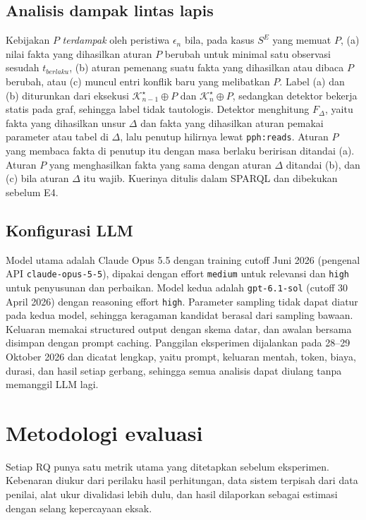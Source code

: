 \documentclass[journal,a4paper]{IEEEtran}
\makeatletter
\DeclareRobustCommand{\en}[1]{{\usefont{\f@encoding}{\f@family}{\f@series}{it}#1\/}}
\newcommand{\K}{\mathcal{K}}
\newcommand{\emas}{\star}
\newcommand{\SE}{S^{E}}
\makeatother
\begin{document}
\subsection{Analisis dampak lintas lapis}
Kebijakan $P$ \emph{terdampak} oleh peristiwa $\epsilon_n$ bila, pada kasus $\SE$ yang memuat $P$, (a) nilai fakta yang dihasilkan aturan $P$ berubah untuk minimal satu observasi sesudah $t_{\mathit{berlaku}}$, (b) aturan pemenang suatu fakta yang dihasilkan atau dibaca $P$ berubah, atau (c) muncul entri konflik baru yang melibatkan $P$. Label (a) dan (b) diturunkan dari eksekusi $\K^{\emas}_{n-1} \oplus P$ dan $\K^{\emas}_n \oplus P$, sedangkan detektor bekerja statis pada graf, sehingga label tidak tautologis. Detektor menghitung $F_\Delta$, yaitu fakta yang dihasilkan unsur $\Delta$ dan fakta yang dihasilkan aturan pemakai parameter atau tabel di $\Delta$, lalu penutup hilirnya lewat \texttt{pph:reads}. Aturan $P$ yang membaca fakta di penutup itu dengan masa berlaku beririsan ditandai (a). Aturan $P$ yang menghasilkan fakta yang sama dengan aturan $\Delta$ ditandai (b), dan (c) bila aturan $\Delta$ itu wajib. Kuerinya ditulis dalam SPARQL dan dibekukan sebelum E4.

\subsection{Konfigurasi LLM}
Model utama adalah Claude Opus 5.5 dengan \en{training cutoff} Juni 2026 (pengenal API \texttt{claude-opus-5-5}), dipakai dengan \en{effort} \texttt{medium} untuk relevansi dan \texttt{high} untuk penyusunan dan perbaikan. Model kedua adalah \texttt{gpt-6.1-sol} (\en{cutoff} 30 April 2026) dengan \en{reasoning effort} \texttt{high}. Parameter \en{sampling} tidak dapat diatur pada kedua model, sehingga keragaman kandidat berasal dari \en{sampling} bawaan. Keluaran memakai \en{structured output} dengan skema datar, dan awalan bersama disimpan dengan \en{prompt caching}. Panggilan eksperimen dijalankan pada 28--29 Oktober 2026 dan dicatat lengkap, yaitu \en{prompt}, keluaran mentah, token, biaya, durasi, dan hasil setiap gerbang, sehingga semua analisis dapat diulang tanpa memanggil LLM lagi.

\section{Metodologi evaluasi}
\label{sec:evaluasi}
Setiap RQ punya satu metrik utama yang ditetapkan sebelum eksperimen. Kebenaran diukur dari perilaku hasil perhitungan, data sistem terpisah dari data penilai, alat ukur divalidasi lebih dulu, dan hasil dilaporkan sebagai estimasi dengan selang kepercayaan eksak.
\end{document}
